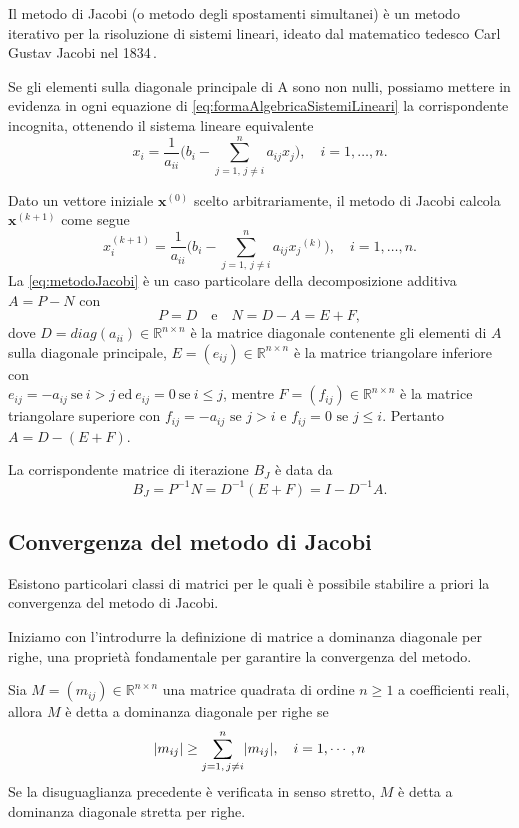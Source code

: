 \label{par:metodoJacobi}
Il metodo di Jacobi (o metodo degli spostamenti simultanei) \`e un metodo iterativo per la risoluzione di sistemi lineari, ideato dal matematico tedesco Carl Gustav Jacobi nel 1834\,\cite{JacobiMethod}.

Se gli elementi sulla diagonale principale di A sono non nulli, possiamo mettere in evidenza in ogni equazione di 
\eqref{eq:formaAlgebricaSistemiLineari} la corrispondente incognita, ottenendo il sistema lineare equivalente
\begin{equation}
    x_{i}=\frac{1}{a_{ii}}\Bigg(b_{i} - \sum_{j=1, \, j \neq i}^{n}a_{ij}x_{j}\Bigg),\quad i=1,\dots,n.
\end{equation}

Dato un vettore iniziale $\mathbf{x}^{(0)}$ scelto arbitrariamente, il metodo di Jacobi calcola $\mathbf{x}^{(k+1)}$ come segue
\begin{equation}
    \label{eq:metodoJacobi}
    x_{i}^{(k+1)}=\frac{1}{a_{ii}}\Bigg(b_{i} - \sum_{j=1, \, j \neq i}^{n}a_{ij}x{_j}^{(k)}\Bigg),\quad i=1,\dots,n.
\end{equation}
La \eqref{eq:metodoJacobi} \`e un caso particolare della decomposizione additiva $A = P-N$ con
\begin{equation*}
    P = D\quad \text{e}\quad N = D - A = E + F,
\end{equation*}
dove $D=diag(a_{ii})\in\mathbb{R}^{n\times n}$ \`e la matrice diagonale contenente gli elementi di $A$ sulla diagonale principale, 
$E=(e_{ij})\in\mathbb{R}^{n\times n}$ \`e la matrice triangolare inferiore con \\ $e_{ij}=-a_{ij} \ \text{se} \ i>j \ \text{ed}\ e_{ij}=0 \ \text{se} \ i\le j$, 
mentre $F=(f_{ij})\in\mathbb{R}^{n\times n}$ \`e la matrice triangolare superiore con $f_{ij}=-a_{ij} \text{ se } j>i$ e $f_{ij}=0 \text{ se } j\le i$.
Pertanto $A = D - (E + F)$.

La corrispondente matrice di iterazione $B_{J}$ \`e data da
\begin{equation}
    B_{J} = P^{-1}N = D^{-1}(E + F) = I - D^{-1}A.
\end{equation}
\subsection{Convergenza del metodo di Jacobi}
Esistono particolari classi di matrici per le quali \`e possibile stabilire a priori la convergenza del metodo di Jacobi.

Iniziamo con l'introdurre la definizione di matrice a dominanza diagonale per righe, una propriet\`a fondamentale per garantire la convergenza del metodo.
\begin{definizione}
    Sia $M = (m_{ij})\in\mathbb{R}^{n \times n}$ una matrice quadrata di ordine $n\ge 1$ a coefficienti reali, allora $M$ \`e detta a dominanza diagonale per righe se
    \[
    \lvert m_{ij}\rvert \ge \sum_{j=1,\, j \neq i}^{n}\lvert m_{ij}\rvert,\quad i = 1,\cdots,n
    \]
    Se la disuguaglianza precedente \`e verificata in senso stretto, $M$ \`e detta a dominanza diagonale stretta per righe. 
\end{definizione}

